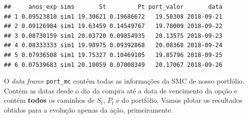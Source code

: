\documentclass[]{book}
\newenvironment{Shaded}{\begin{snugshade}}{\end{snugshade}}
\newcommand{\DataTypeTok}[1]{\textcolor[rgb]{0.13,0.29,0.53}{#1}}
\newcommand{\DecValTok}[1]{\textcolor[rgb]{0.00,0.00,0.81}{#1}}
\newcommand{\KeywordTok}[1]{\textcolor[rgb]{0.13,0.29,0.53}{\textbf{#1}}}
\newcommand{\NormalTok}[1]{#1}
\newcommand{\OperatorTok}[1]{\textcolor[rgb]{0.81,0.36,0.00}{\textbf{#1}}}
\newcommand{\OtherTok}[1]{\textcolor[rgb]{0.56,0.35,0.01}{#1}}
\newcommand{\StringTok}[1]{\textcolor[rgb]{0.31,0.60,0.02}{#1}}
\theoremstyle{definition}
\theoremstyle{definition}
\theoremstyle{definition}
\theoremstyle{remark}
\begin{document}
\begin{verbatim}
##     anos_exp sims       St         Pt port_valor       data
## 1 0.09523810 sim1 19.30621 0.19686672   19.50308 2018-09-21
## 2 0.09126984 sim1 19.63459 0.14549767   19.78009 2018-09-22
## 3 0.08730159 sim1 20.03720 0.09854935   20.13575 2018-09-23
## 4 0.08333333 sim1 19.98975 0.09392868   20.08368 2018-09-24
## 5 0.07936508 sim1 19.75327 0.10469105   19.85796 2018-09-25
## 6 0.07539683 sim1 20.10059 0.07008349   20.17067 2018-09-26
\end{verbatim}

O \emph{data frame} \texttt{port\_mc} contém todas as informações da SMC de nosso portfólio. Contém as datas desde o dia da compra até a data de vencimento da opção e contém \textbf{todos} os caminhos de \(S_t\), \(P_t\) e do portfólio. Vamos plotar os resultados obtidos para a evolução apenas da ação, primeiramente.

\begin{Shaded}
\end{Shaded}
\end{document}
